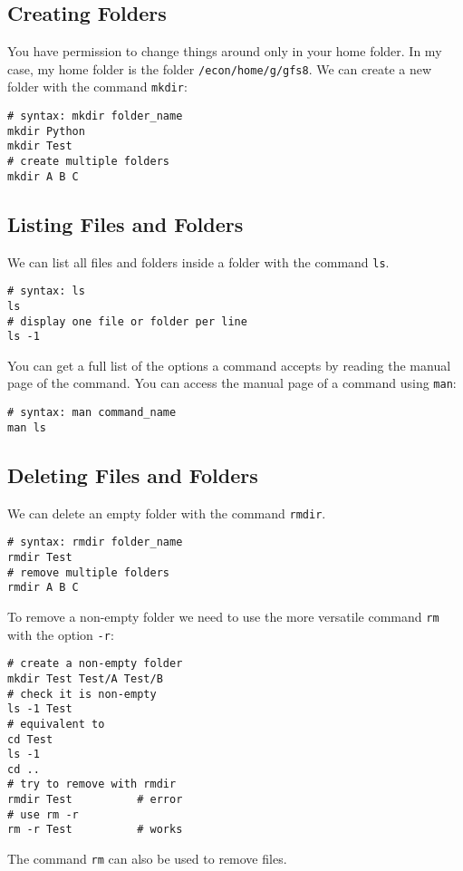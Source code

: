 \documentclass[12pt, a4paper]{article}
\begin{document}
\subsection{Creating Folders}
\label{sec:org66bbf46}
You have permission to change things around only in your home folder.
In my case, my home folder is the folder \texttt{/econ/home/g/gfs8}.
We can create a new folder with the command \texttt{mkdir}:
\lstset{language=bash,label= ,caption= ,captionpos=b,firstnumber=1,numbers=left,style=bash}
\begin{lstlisting}
# syntax: mkdir folder_name
mkdir Python
mkdir Test
# create multiple folders
mkdir A B C
\end{lstlisting}
\subsection{Listing Files and Folders}
\label{sec:org337da17}
We can list all files and folders inside a folder with the command \texttt{ls}.
\lstset{language=bash,label= ,caption= ,captionpos=b,firstnumber=1,numbers=left,style=bash}
\begin{lstlisting}
# syntax: ls
ls
# display one file or folder per line
ls -1
\end{lstlisting}
You can get a full list of the options a command accepts by reading the manual page of the command.
You can access the manual page of a command using \texttt{man}:
\lstset{language=bash,label= ,caption= ,captionpos=b,firstnumber=1,numbers=left,style=bash}
\begin{lstlisting}
# syntax: man command_name
man ls
\end{lstlisting}
\subsection{Deleting Files and Folders}
\label{sec:org6cddabf}
We can delete an empty folder with the command \texttt{rmdir}.
\lstset{language=bash,label= ,caption= ,captionpos=b,firstnumber=1,numbers=left,style=bash}
\begin{lstlisting}
# syntax: rmdir folder_name
rmdir Test
# remove multiple folders
rmdir A B C
\end{lstlisting}
To remove a non-empty folder we need to use the more versatile command \texttt{rm} with the option \texttt{-r}:
\lstset{language=bash,label= ,caption= ,captionpos=b,firstnumber=1,numbers=left,style=bash}
\begin{lstlisting}
# create a non-empty folder
mkdir Test Test/A Test/B
# check it is non-empty
ls -1 Test
# equivalent to
cd Test
ls -1
cd ..
# try to remove with rmdir
rmdir Test			# error
# use rm -r
rm -r Test			# works
\end{lstlisting}
The command \texttt{rm} can also be used to remove files.
\end{document}
